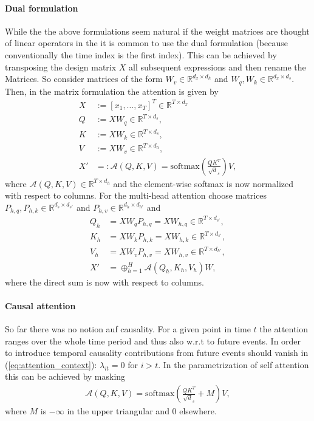 \documentclass[12pt,a4paper]{article}
\begin{document}
\paragraph{Dual formulation} While the the above formulations seem natural if the weight matrices are thought of linear operators in the it is common to use the dual formulation (because conventionally the time index is the first index). This can be achieved by transposing the design matrix $X$ all subsequent expressions and then rename the Matrices. 
So consider matrices of the form $W_v \in \mathbb{R}^{d_x \times d_h}$ and $W_q, W_k \in \mathbb{R}^{d_x \times d_s}$.  Then, in the matrix formulation the attention is given by
\begin{align}
X &:=[x_1,\dots, x_T]^T \in \mathbb{R}^{T\times d_x}\\
Q &:= X W_q \in \mathbb{R} ^ {T \times d_s}, \\ 
K &:= X W_k \in \mathbb{R} ^ {T \times d_s},\\ 
V &:= X W_v \in \mathbb{R} ^ {T \times d_h}, \\ 
X'&=:\mathcal A (Q, K, V)  =  \text{softmax}\left(\frac{Q K^T}{\sqrt d_s} \right) V,
\end{align}
where $\mathcal A (Q, K, V)\in \mathbb{R} ^ {T \times d_h}$ and the element-wise softmax is now normalized with respect to columns. For the multi-head attention choose matrices $P_{h,q}, P_{h,k} \in \mathbb{R}^{d_s \times d_{s'} }$ and $P_{h,v} \in \mathbb{R}^{d_h \times d_{h'} }$ and 
\begin{align}
Q_h &= X W_q  P_{h,q}  = X W_{h,q}   \in \mathbb{R} ^ {T \times d_{s'}}, \\ 
K_h &= X W_k  P_{h,k}  = X W_{h,k} \in \mathbb{R} ^ {T \times d_{s'}},\\ 
V_h &= X W_v P_{h,v}  = X W_{h,v}  \in \mathbb{R} ^ {T\times d_{h'}}, \\
X' &= \oplus_{h=1}^H \mathcal A(Q_h, K_h, V_h) W,
\end{align}
where the direct sum is now with respect to  columns.



\paragraph{Causal attention}
So far there was no notion auf causality. For a given point in time $t$ the attention ranges over the whole time period and thus also w.r.t to future events. In order to introduce temporal causality contributions from future events should vanish in (\ref{eq:attention_context}): $\lambda _{it} = 0$ for $i > t$. In the parametrization of self attention this can be achieved by masking
\begin{align}
\mathcal A (Q, K, V)  =  \text{softmax}\left(\frac{Q K^T}{\sqrt d_s} + M\right) V,	
\end{align}
where $M$ is $-\infty$ in the upper triangular and 0 elsewhere.
\end{document}
